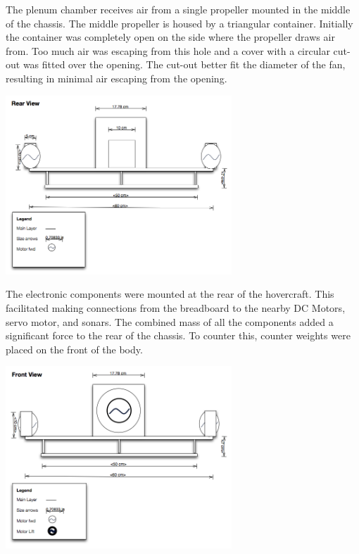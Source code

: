 The plenum chamber receives air from a single propeller mounted in the middle of the chassis. The middle propeller is housed by a triangular container. Initially the container was completely open on the side where the propeller draws air from. Too much air was escaping from this hole and a cover with a circular cut-out was fitted over the opening. The cut-out better fit the diameter of the fan, resulting in minimal air escaping from the opening.

  \begin{minipage}{6.5in}
  \begin{center}
    \includegraphics[width=85mm]{imageSources/rearView.png}
  \end{center}
  \label{rearView}
  \end{minipage}

The electronic components were mounted at the rear of the hovercraft. This facilitated making connections from the breadboard to the nearby DC Motors, servo motor, and sonars. The combined mass of all the components added a significant force to the rear of the chassis. To counter this, counter weights were placed on the front of the body.

\begin{minipage}{6.5in}
  \begin{center}
    \includegraphics[width=85mm]{imageSources/frontView.png}
  \end{center}
  \label{frontView}
\end{minipage}


